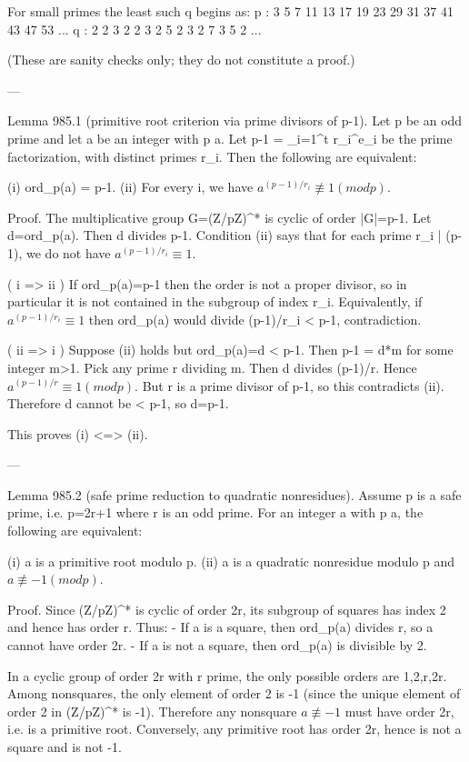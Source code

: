 For small primes the least such q begins as:
  p :  3  5  7 11 13 17 19 23 29 31 37 41 43 47 53 ...
  q :  2  2  3  2  2  3  2  5  2  3  2  7  3  5  2 ...

(These are sanity checks only; they do not constitute a proof.)

---

Lemma 985.1 (primitive root criterion via prime divisors of p-1).
Let p be an odd prime and let a be an integer with p \nmid a. Let p-1 = \prod_{i=1}^t r_i^{e_i}
be the prime factorization, with distinct primes r_i. Then the following are equivalent:

  (i) ord_p(a) = p-1.
  (ii) For every i, we have \(a^{(p-1)/r_i} \not\equiv 1 (mod p)\).

Proof.
The multiplicative group G=(Z/pZ)^* is cyclic of order |G|=p-1.
Let d=ord_p(a). Then d divides p-1. Condition (ii) says that for each prime r_i | (p-1),
we do not have \(a^{(p-1)/r_i} \equiv 1\).

( i => ii ) If ord_p(a)=p-1 then the order is not a proper divisor, so in particular it is not
contained in the subgroup of index r_i. Equivalently, if \(a^{(p-1)/r_i}\equiv 1\) then ord_p(a)
would divide (p-1)/r_i < p-1, contradiction.

( ii => i ) Suppose (ii) holds but ord_p(a)=d < p-1. Then p-1 = d*m for some integer m>1.
Pick any prime r dividing m. Then d divides (p-1)/r. Hence \(a^{(p-1)/r} \equiv 1 (mod p)\).
But r is a prime divisor of p-1, so this contradicts (ii).
Therefore d cannot be < p-1, so d=p-1.

This proves (i) <=> (ii).

---

Lemma 985.2 (safe prime reduction to quadratic nonresidues).
Assume p is a safe prime, i.e. p=2r+1 where r is an odd prime.
For an integer a with p \nmid a, the following are equivalent:

  (i) a is a primitive root modulo p.
  (ii) a is a quadratic nonresidue modulo p and \(a \not\equiv -1 (mod p)\).

Proof.
Since (Z/pZ)^* is cyclic of order 2r, its subgroup of squares has index 2 and hence has
order r. Thus:
- If a is a square, then ord_p(a) divides r, so a cannot have order 2r.
- If a is not a square, then ord_p(a) is divisible by 2.

In a cyclic group of order 2r with r prime, the only possible orders are 1,2,r,2r.
Among nonsquares, the only element of order 2 is -1 (since the unique element of order 2
in (Z/pZ)^* is -1). Therefore any nonsquare \(a \not\equiv -1\) must have order 2r, i.e. is a
primitive root.
Conversely, any primitive root has order 2r, hence is not a square and is not -1.

